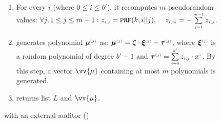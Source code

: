 \begin{figure}[ht]
\begin{center}
\begin{tcolorbox}[enhanced,width=4.78in, height=110mm,right=.5mm,
    drop fuzzy shadow southwest,
    colframe=black,colback=white]
{{\begin{enumerate}[leftmargin=-.2mm]
\begin{enumerate}[leftmargin=1.4mm]
\item\label{ZSPA-A::gen-z} For every $i$ (where $0\leq i \leq b'$), it recomputes $m$ pseudorandom values: 
%
$\forall j, 1\leq j \leq m-1: z_{\scriptscriptstyle i,j}=\mathtt{PRF}(k,i||j), \hspace{4mm} z_{\scriptscriptstyle i,m}=-\sum\limits^{\scriptscriptstyle m-1}_{\scriptscriptstyle j=1}z_{\scriptscriptstyle i,j}$.
%
 \item generates polynomial $\bm\mu^{\scriptscriptstyle (j)}$ as: 
   $\bm\mu^{\scriptscriptstyle (j)} = \bm\zeta\cdot \bm\xi^{\scriptscriptstyle (j)}-\bm\tau^{\scriptscriptstyle (j)}$, 
    where $\bm\xi^{\scriptscriptstyle (j)}$ is a random polynomial of degree $b'-1$ and $\bm\tau^{\scriptscriptstyle (j)}=\sum\limits^{\scriptscriptstyle b'}_{\scriptscriptstyle i=0}z_{\scriptscriptstyle i,j}\cdot x^{\scriptscriptstyle i}$. By this step, a vector $\vv{{\mu}}$ containing at most $m$ polynomials is generated. 
%
 \item returns   list $L$ and $\vv{{\mu}}$.
 
\end{enumerate}
 \end{enumerate}
}}
 \end{tcolorbox}
\end{center}
\vspace{-5.4mm}
\caption{\zspa with an external auditor (\zspaa)} 
\label{fig:arbiter}
\vspace{-4.5mm}
\end{figure}



